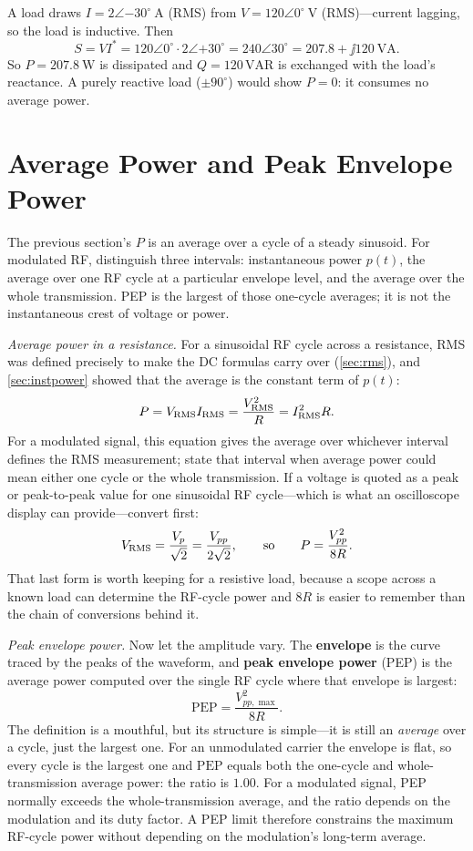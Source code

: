 \begin{workedbox}
A load draws \(I=2\angle{-30^\circ}\ \si{\ampere}\) (RMS) from
\(V=120\angle0^\circ\ \si{\volt}\) (RMS)---current lagging, so the load is
inductive. Then
\[
S=VI^{*}=120\angle0^\circ\cdot 2\angle{+30^\circ}=240\angle30^\circ
=207.8+\jj120\ \mathrm{VA}.
\]
So \(P=\SI{207.8}{\watt}\) is dissipated and \(Q=120\,\mathrm{VAR}\) is exchanged with
the load's reactance. A purely reactive load (\(\pm90^\circ\)) would show
\(P=0\): it consumes no average power.
\end{workedbox}

\section{Average Power and Peak Envelope Power}
\label{sec:pep}
The previous section's \(P\) is an average over a cycle of a steady sinusoid. For
modulated RF, distinguish three intervals: instantaneous power \(p(t)\), the
average over one RF cycle at a particular envelope level, and the average over the
whole transmission. PEP is the largest of those one-cycle averages; it is not the
instantaneous crest of voltage or power.

\emph{Average power in a resistance.} For a sinusoidal RF cycle across a resistance,
RMS was defined precisely to make the DC formulas carry over
(\cref{sec:rms}), and \cref{sec:instpower} showed that the average is the constant
term of \(p(t)\):
\[
P=V_{\mathrm{RMS}}I_{\mathrm{RMS}}=\frac{V_{\mathrm{RMS}}^2}{R}=I_{\mathrm{RMS}}^2R .
\]
For a modulated signal, this equation gives the average over whichever interval
defines the RMS measurement; state that interval when average power could mean
either one cycle or the whole transmission. If a voltage is quoted as a peak or
peak-to-peak value for one sinusoidal RF cycle---which is what an oscilloscope
display can provide---convert first:
\[
V_{\mathrm{RMS}}=\frac{V_p}{\sqrt2}=\frac{V_{pp}}{2\sqrt2},
\qquad\text{so}\qquad
P=\frac{V_{pp}^2}{8R} .
\]
That last form is worth keeping for a resistive load, because a scope across a known
load can determine the RF-cycle power and \(8R\) is easier to remember than the chain
of conversions behind it.

\emph{Peak envelope power.} Now let the amplitude vary. The \textbf{envelope} is
the curve traced by the peaks of the waveform, and \textbf{peak envelope power}
(PEP) is the average power computed over the single RF cycle where that envelope is
largest:
\[
\mathrm{PEP}=\frac{V_{pp,\max}^2}{8R} .
\]
\cite[p.~222]{carr2002measurement}
The definition is a mouthful, but its structure is simple---it is still an
\emph{average} over a cycle, just the largest one. For an unmodulated carrier the
envelope is flat, so every cycle is the largest one and \(\mathrm{PEP}\) equals
both the one-cycle and whole-transmission average power: the ratio is \(1.00\). For
a modulated signal, PEP normally exceeds the whole-transmission average, and the
ratio depends on the modulation and its duty factor. A PEP limit therefore constrains
the maximum RF-cycle power without depending on the modulation's long-term average.

